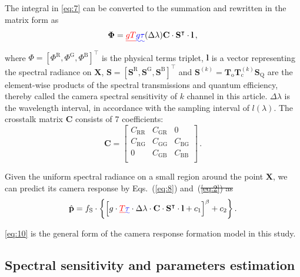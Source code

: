 \documentclass[9pt,twocolumn,twoside]{osajnl}
\providecommand{\DIFadd}[1]{{\protect\color{blue}\uwave{#1}}} %
\providecommand{\DIFdel}[1]{{\protect\color{red}\sout{#1}}}                      %
\providecommand{\DIFaddbegin}{} %
\providecommand{\DIFaddend}{} %
\providecommand{\DIFdelbegin}{} %
\providecommand{\DIFdelend}{} %
\begin{document}
The integral in \eqref{eq:7} can be converted to the summation and rewritten in the matrix form as
\begin{equation}
\mathbf{\Phi} = \DIFdelbegin \DIFdel{gT}\DIFdelend \DIFaddbegin \DIFadd{g\tau}\DIFaddend (\Delta\lambda)\mathbf{C}\cdot\mathbf{S}^\intercal\cdot\mathbf{l}\,,
\label{eq:8}
\end{equation}
where $\Phi = \left[\Phi^\text{R},\Phi^\text{G},\Phi^\text{B}\right]^\intercal$ is the physical terms triplet, $\mathbf{l}$ is a vector representing the spectral radiance on $\mathbf{X}$, $\mathbf{S} = \left[\mathbf{S}^\text{R},\mathbf{S}^\text{G},\mathbf{S}^\text{B}\right]^\intercal$ and $\mathbf{S}^{(k)} = \mathbf{T}_\text{o}\mathbf{T}_\text{c}^{(k)}\mathbf{S}_\text{Q}$ are the element-wise products of the spectral transmissions and quantum efficiency, thereby called the camera spectral sensitivity of $k$ channel in this article. $\Delta\lambda$ is the wavelength interval, in accordance with the sampling interval of $l(\lambda)$. The crosstalk matrix $\mathbf{C}$ consists of 7 coefficients:
\begin{equation}
\mathbf{C} = \begin{bmatrix}
C_\text{RR} & C_\text{GR} & 0 \\
C_\text{RG} & C_\text{GG} & C_\text{BG} \\
0			& C_\text{GB} & C_\text{BB} \\
\end{bmatrix}\,.
\label{eq:9}
\end{equation}

Given the uniform spectral radiance on a small region around the point $\mathbf{X}$, we can predict its camera response by Eqs.~(\ref{eq:8}) and~(\DIFdelbegin \DIFdel{\ref{eq:2}) as
}\DIFdelend \DIFaddbegin \DIFadd{\ref{eq:3}) as
}\DIFaddend \begin{equation}
\hat{\mathbf{p}} = f_\text{S}\cdot\bigg\{\Big[g\cdot{}\DIFdelbegin \DIFdel{T}\DIFdelend \DIFaddbegin \DIFadd{\tau }\DIFaddend \cdot\Delta\lambda\cdot\mathbf{C}\cdot\mathbf{S}^\intercal\cdot\mathbf{l} + c_1\Big]^\beta + c_2\bigg\}\,.
\label{eq:10}
\end{equation}

\eqref{eq:10} is the general form of the camera response formation model in this study.

\subsection{Spectral sensitivity and parameters estimation}\label{sec:estimation}
\end{document}
